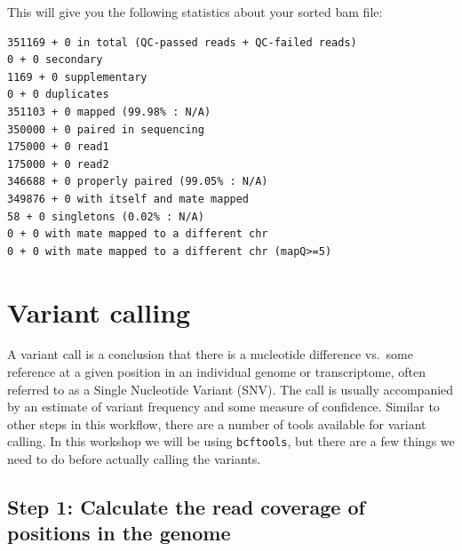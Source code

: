 \documentclass[
  letterpaper,
  DIV=11,
  numbers=noendperiod]{scrreprt}
\newenvironment{Shaded}{\begin{snugshade}}{\end{snugshade}}
\newcommand{\ExtensionTok}[1]{\textcolor[rgb]{0.00,0.23,0.31}{#1}}
\newcommand{\NormalTok}[1]{\textcolor[rgb]{0.00,0.23,0.31}{#1}}
\begin{document}
\begin{Shaded}
\end{Shaded}

This will give you the following statistics about your sorted bam file:

\begin{verbatim}
351169 + 0 in total (QC-passed reads + QC-failed reads)
0 + 0 secondary
1169 + 0 supplementary
0 + 0 duplicates
351103 + 0 mapped (99.98% : N/A)
350000 + 0 paired in sequencing
175000 + 0 read1
175000 + 0 read2
346688 + 0 properly paired (99.05% : N/A)
349876 + 0 with itself and mate mapped
58 + 0 singletons (0.02% : N/A)
0 + 0 with mate mapped to a different chr
0 + 0 with mate mapped to a different chr (mapQ>=5)
\end{verbatim}

\hypertarget{variant-calling}{%
\section{Variant calling}\label{variant-calling}}

A variant call is a conclusion that there is a nucleotide difference
vs.~some reference at a given position in an individual genome or
transcriptome, often referred to as a Single Nucleotide Variant (SNV).
The call is usually accompanied by an estimate of variant frequency and
some measure of confidence. Similar to other steps in this workflow,
there are a number of tools available for variant calling. In this
workshop we will be using \texttt{bcftools}, but there are a few things
we need to do before actually calling the variants.

\begin{Shaded}
\end{Shaded}

\hypertarget{step-1-calculate-the-read-coverage-of-positions-in-the-genome}{%
\subsection{Step 1: Calculate the read coverage of positions in the
genome}\label{step-1-calculate-the-read-coverage-of-positions-in-the-genome}}
\end{document}
